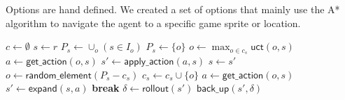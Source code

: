Options are hand defined. We created a set of options that mainly use the A*
algorithm to navigate the agent to a specific game sprite or location.

\begin{algorithm}
	\caption{$\mathsf{O-MCTS}(r, m, d)$}
	\label{alg:omcts}
	\begin{algorithmic}[1]
		\State $c \gets \emptyset$ 
		 \label{alg:omcts:mainloop}
			\State $s \gets r$ 
			 \label{alg:omcts:innerloop}
			 \label{alg:omcts:sp} 
				\State $P_s \gets \cup_o (s \in I_o)$ 
				\Else
					\State $P_s \gets \{o\}$ 
				\EndIf \label{alg:omcts:ep}
					\State $o \gets \max_{o \in c_s} \mathsf{uct}(o, s)$ \label{alg:omcts:uct} 
					\State $a \gets \mathsf{get\_action}(o, s)$ 
					\State $s' \gets \mathsf{apply\_action}(a, s)$ \label{alg:omcts:apply}
					\State $s \gets s'$ \label{alg:omcts:ss} 
				\Else \label{alg:omcts:sexpand}
					\State $o \gets \mathsf{random\_element}(P_s - c_s)$ 
					\State $c_s \gets c_s \cup \{o\}$ 
					\State $a \gets \mathsf{get\_action}(o, s)$ 
					\State $s' \gets \mathsf{expand}(s, a)$ 
					\State \textbf{break} \label{alg:omcts:break}
				\EndIf \label{alg:omcts:eexpand}
			\EndWhile
			\State $\delta \gets \mathsf{rollout}(s')$ \label{alg:omcts:rollout}
			\State $\mathsf{back\_up}(s', \delta)$ \label{alg:omcts:backup}
		\EndWhile
		\State {}
	\end{algorithmic}
\end{algorithm}

